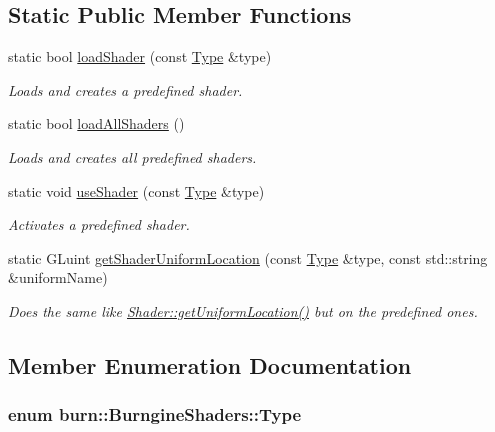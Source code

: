 \subsection*{Static Public Member Functions}
\begin{DoxyCompactItemize}
\item 
static bool \hyperlink{structburn_1_1_burngine_shaders_ab9ebed7c4668a72e7cbbd0630226d7ab}{load\-Shader} (const \hyperlink{structburn_1_1_burngine_shaders_a2c339d4b838b7efe94ba8ef7f480ef41}{Type} \&type)
\begin{DoxyCompactList}\small\item\em Loads and creates a predefined shader. \end{DoxyCompactList}\item 
static bool \hyperlink{structburn_1_1_burngine_shaders_a33e19e46e7bc1b6d18f05d2ee233dc50}{load\-All\-Shaders} ()
\begin{DoxyCompactList}\small\item\em Loads and creates all predefined shaders. \end{DoxyCompactList}\item 
static void \hyperlink{structburn_1_1_burngine_shaders_a73204821ded279b767394accf6f7ee75}{use\-Shader} (const \hyperlink{structburn_1_1_burngine_shaders_a2c339d4b838b7efe94ba8ef7f480ef41}{Type} \&type)
\begin{DoxyCompactList}\small\item\em Activates a predefined shader. \end{DoxyCompactList}\item 
static G\-Luint \hyperlink{structburn_1_1_burngine_shaders_adcd311730ecd21d2729199952a5bdf11}{get\-Shader\-Uniform\-Location} (const \hyperlink{structburn_1_1_burngine_shaders_a2c339d4b838b7efe94ba8ef7f480ef41}{Type} \&type, const std\-::string \&uniform\-Name)
\begin{DoxyCompactList}\small\item\em Does the same like \hyperlink{classburn_1_1_shader_ae96b86c6da489d759bec9be7664040dc}{Shader\-::get\-Uniform\-Location()} but on the predefined ones. \end{DoxyCompactList}\end{DoxyCompactItemize}


\subsection{Member Enumeration Documentation}
\hypertarget{structburn_1_1_burngine_shaders_a2c339d4b838b7efe94ba8ef7f480ef41}{
\subsubsection[{Type}]{\setlength{\rightskip}{0pt plus 5cm}enum {\bf burn\-::\-Burngine\-Shaders\-::\-Type}}}\label{structburn_1_1_burngine_shaders_a2c339d4b838b7efe94ba8ef7f480ef41}


